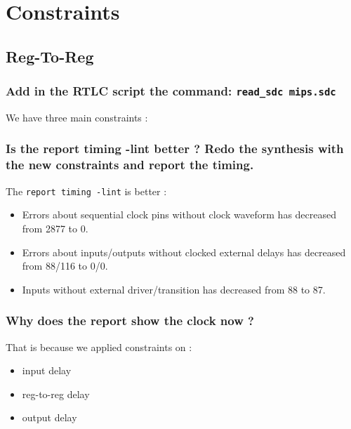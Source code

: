 \documentclass[11pt,a4paper,sans,dvipsnames]{report}
\begin{document}
	\newpage
	\section{Constraints}
	\subsection{Reg-To-Reg}
	\subsubsection*{Add in the RTLC script the command: \texttt{read\_sdc mips.sdc}}

	We have three main constraints  :

	\begin{figure}[h!]
		\centering
		
		\label{fig:main_constraints}
	\end{figure}

	\subsubsection*{Is the report timing -lint better ? Redo the synthesis with the new constraints and report the timing.}

	The \texttt{report timing -lint} is better :
	\begin{itemize}
		\item Errors about sequential clock pins without clock waveform has decreased from 2877 to 0.
		\item Errors about inputs/outputs without clocked external delays has decreased from 88/116 to 0/0.
		\item Inputs without external driver/transition has decreased from 88 to 87.
	\end{itemize}

	\subsubsection*{Why does the report show the clock now ?}
	That is because we applied constraints on : 
	\begin{itemize}
		\item input delay
		\item reg-to-reg delay
		\item output delay
	\end{itemize}
\end{document}
